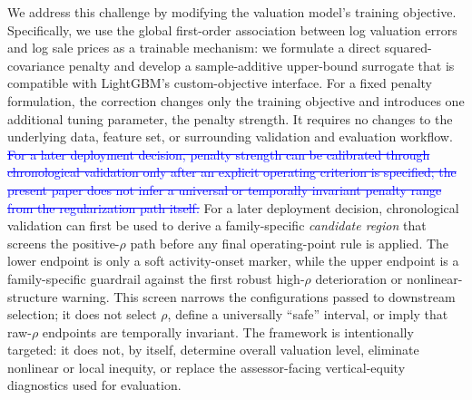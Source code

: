 \documentclass[10pt]{article}
\theoremstyle{definition}
\newcommand{\1}{\mathbf{1}}
\newcommand{\oldtext}[1]{\textcolor{blue}{\sout{#1}}}
\newcommand{\newtext}[1]{\textcolor{impGreen}{#1}}
\newcommand{\latesttext}[1]{\textcolor{latestPurple}{#1}}
\begin{document}

{We address this challenge by modifying the valuation model's training objective. Specifically, we use the global first-order association between log valuation errors and log sale prices as a trainable mechanism: we formulate a direct squared-covariance penalty and develop a sample-additive upper-bound surrogate that is compatible with LightGBM's custom-objective interface. For a fixed penalty formulation, the correction changes only the training objective and introduces one additional tuning parameter, the penalty strength. It requires no changes to the underlying data, feature set, or surrounding validation and evaluation workflow. \oldtext{For a later deployment decision, penalty strength can be calibrated through chronological validation only after an explicit operating criterion is specified; the present paper does not infer a universal or temporally invariant penalty range from the regularization path itself.}
\latesttext{For a later deployment decision, chronological validation can first be used to derive a family-specific \emph{candidate region} that screens the positive-$\rho$ path before any final operating-point rule is applied. The lower endpoint is only a soft activity-onset marker, while the upper endpoint is a family-specific guardrail against the first robust high-$\rho$ deterioration or nonlinear-structure warning. This screen narrows the configurations passed to downstream selection; it does not select $\rho$, define a universally ``safe'' interval, or imply that raw-$\rho$ endpoints are temporally invariant.} The framework is intentionally targeted: it does not, by itself, determine overall valuation level, eliminate nonlinear or local inequity, or replace the assessor-facing vertical-equity diagnostics used for evaluation.}
\end{document}
